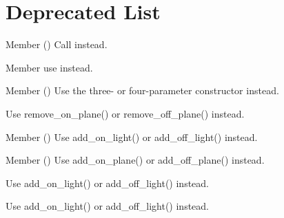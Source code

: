 \chapter{Deprecated List}
\hypertarget{deprecated}{}\label{deprecated}

\begin{DoxyRefList}
\item[Member \doxylink{classCharacter_a978d9c022826651f3e3925257e353caf}{Character\+::update\+\_\+to\+\_\+now} ()]\label{deprecated__deprecated000012}%
%
Call  instead.  
\item[Member \doxylink{collisionTube_8h_a9c1468a8b64343ddac1f59cf59952f56}{Collision\+Tube} ]\label{deprecated__deprecated000013}%
%
use  instead.  
\item[Member \doxylink{eggRenderState_8cxx_a57916730bda635a525d4483d5445618f}{CPT} (\doxylink{classRenderAttrib}{Render\+Attrib}) \doxylink{classEggRenderState}{Egg\+Render\+State}]\label{deprecated__deprecated000040}%
%
Use the three-\/ or four-\/parameter constructor instead. 

\label{deprecated__deprecated000039}%
%
Use remove\+\_\+on\+\_\+plane() or remove\+\_\+off\+\_\+plane() instead.  
\item[Member \doxylink{lightAttrib_8cxx_a98a42ac5fd23140fad0429a693829260}{CPT} (\doxylink{classRenderAttrib}{Render\+Attrib}) \doxylink{classLightAttrib}{Light\+Attrib}]\label{deprecated__deprecated000042}%
%
Use add\+\_\+on\+\_\+light() or add\+\_\+off\+\_\+light() instead.  
\item[Member \doxylink{eggRenderState_8cxx_a57916730bda635a525d4483d5445618f}{CPT} (\doxylink{classRenderAttrib}{Render\+Attrib}) \doxylink{classEggRenderState}{Egg\+Render\+State}]\label{deprecated__deprecated000038}%
%
Use add\+\_\+on\+\_\+plane() or add\+\_\+off\+\_\+plane() instead. 

\label{deprecated__deprecated000043}%
%
Use add\+\_\+on\+\_\+light() or add\+\_\+off\+\_\+light() instead. 

\label{deprecated__deprecated000044}%
%
Use add\+\_\+on\+\_\+light() or add\+\_\+off\+\_\+light() instead. 


\end{DoxyRefList}
